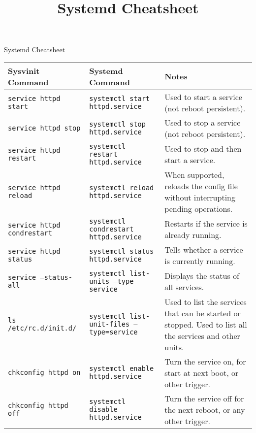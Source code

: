 \documentclass[a4paper]{article}
\title{Systemd Cheatsheet}
\begin{document}
\begin{center}

{\huge Systemd Cheatsheet}

\vspace{8mm}
\small

\begin{tabularx}{\textwidth}{ |l|X|X| }
\hline
\rowcolor[gray]{.8}
\bfseries Sysvinit Command    & \bfseries Systemd Command                                                             & \bfseries Notes \\\hline
\tt service httpd start       & \tt systemctl start httpd.service                                                     & Used to start a service (not reboot persistent). \\\hline
\tt service httpd stop        & \tt systemctl stop httpd.service                                                      & Used to stop a service (not reboot persistent). \\\hline
\tt service httpd restart     & \tt systemctl restart httpd.service                                                   & Used to stop and then start a service. \\\hline
\tt service httpd reload      & \tt systemctl reload httpd.service                                                    & When supported, reloads the config file without interrupting pending operations. \\\hline
\tt service httpd condrestart & \tt systemctl condrestart httpd.service                                               & Restarts if the service is already running. \\\hline
\tt service httpd status      & \tt systemctl status httpd.service                                                    & Tells whether a service is currently running. \\\hline
\tt service --status-all      & \tt systemctl list-units --type service                                               & Displays the status of all services. \\\hline
\tt ls /etc/rc.d/init.d/      & \tt systemctl list-unit-files --type=service                                          & Used to list the services that can be started or stopped. Used to list all the services and other units. \\\hline
\tt chkconfig httpd on        & \tt systemctl enable httpd.service                                                    & Turn the service on, for start at next boot, or other trigger. \\\hline
\tt chkconfig httpd off       & \tt systemctl disable httpd.service                                                   & Turn the service off for the next reboot, or any other trigger. \\\hline

\end{tabularx}
\end{center}
\end{document}
